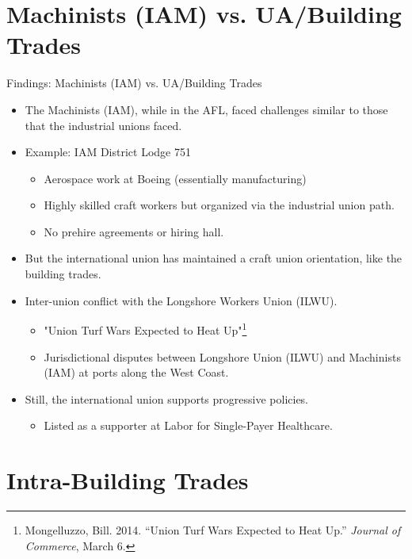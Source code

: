 \documentclass{beamer}
\begin{document}
\section{Machinists (IAM) vs. UA/Building Trades}
\begin{frame}{Findings: Machinists (IAM) vs. UA/Building Trades}
	\begin{itemize}
		\item The Machinists (IAM), while in the AFL, faced challenges similar to those that the industrial unions faced.
		\item Example: IAM District Lodge 751
		\begin{itemize}
			\item Aerospace work at Boeing (essentially manufacturing)
			\item Highly skilled craft workers but organized via the industrial union path.
			\item No prehire agreements or hiring hall.
		\end{itemize}
		\item But the international union has maintained a craft union orientation, like the building trades.
		\item Inter-union conflict with the Longshore Workers Union (ILWU).
			\begin{itemize}
				\item "Union Turf Wars Expected to Heat Up"\footnote{\tiny Mongelluzzo, Bill. 2014. “Union Turf Wars Expected to Heat Up.” \textit{Journal of Commerce}, March 6.}
				\item Jurisdictional disputes between Longshore Union (ILWU) and Machinists (IAM) at ports along the West Coast.
			\end{itemize}
		\item Still, the international union supports progressive policies.
			\begin{itemize}
				\item Listed as a supporter at Labor for Single-Payer Healthcare.
			\end{itemize}
	\end{itemize}
\end{frame}

\section{Intra-Building Trades}
\end{document}

